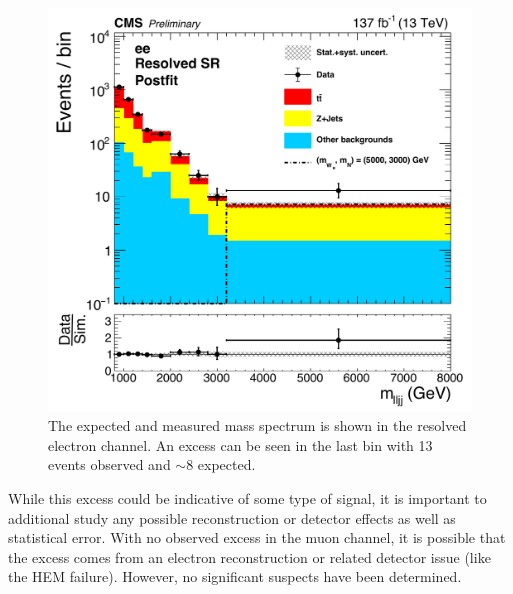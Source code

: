\begin{figure}[!tp]
    \centering
    \includegraphics[width=\textwidth]{figures/Results/AllYears_PostFit_eeRes.pdf}
    \caption[
       Multi-year resolved electron mass spectrum
    ]{
        The expected and measured mass spectrum is shown in the resolved electron channel. An excess can be seen in the last bin with 13 events observed and $\sim 8$ expected.
    }
    \label{fig:1Dlimit}
\end{figure}

While this excess could be indicative of some type of signal, it is important to additional study any possible reconstruction or detector effects as well as statistical error. With no observed excess in the muon channel, it is possible that the excess comes from an electron reconstruction or related detector issue (like the HEM failure). However, no significant suspects have been determined.



\label{ch:limit_setting}